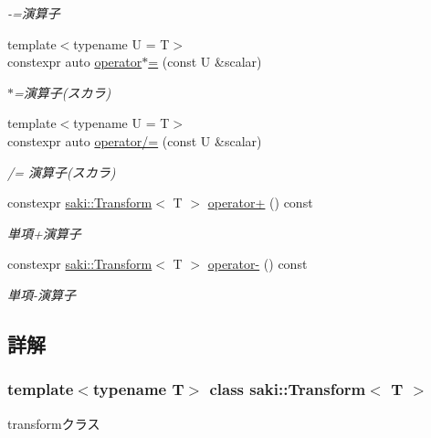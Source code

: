 \begin{DoxyCompactItemize}
\begin{DoxyCompactList}\small\item\em -\/=演算子 \end{DoxyCompactList}\item 
{\footnotesize template$<$typename U  = T$>$ }\\constexpr auto \mbox{\hyperlink{classsaki_1_1_transform_ad1cd1eb578c1ce8b25219f68094276cd}{operator$\ast$=}} (const U \&scalar)
\begin{DoxyCompactList}\small\item\em $\ast$=演算子(スカラ) \end{DoxyCompactList}\item 
{\footnotesize template$<$typename U  = T$>$ }\\constexpr auto \mbox{\hyperlink{classsaki_1_1_transform_a703c619dd40015754cce34e3a73c8f14}{operator/=}} (const U \&scalar)
\begin{DoxyCompactList}\small\item\em /= 演算子(スカラ) \end{DoxyCompactList}\item 
constexpr \mbox{\hyperlink{classsaki_1_1_transform}{saki\+::\+Transform}}$<$ T $>$ \mbox{\hyperlink{classsaki_1_1_transform_a3b35f6ee5bc410faf3025fa3d8c4abf0}{operator+}} () const
\begin{DoxyCompactList}\small\item\em 単項+演算子 \end{DoxyCompactList}\item 
constexpr \mbox{\hyperlink{classsaki_1_1_transform}{saki\+::\+Transform}}$<$ T $>$ \mbox{\hyperlink{classsaki_1_1_transform_a771da4173222f8200bfdfee101be1e28}{operator-\/}} () const
\begin{DoxyCompactList}\small\item\em 単項-\/演算子 \end{DoxyCompactList}\end{DoxyCompactItemize}


\subsection{詳解}
\subsubsection*{template$<$typename T$>$\newline
class saki\+::\+Transform$<$ T $>$}

transformクラス 

